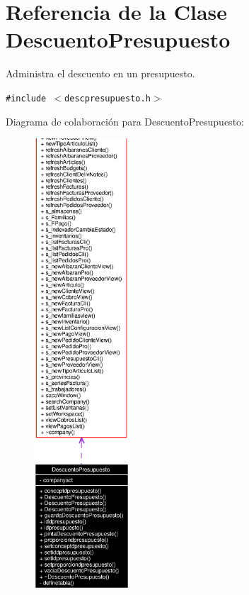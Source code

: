 \section{Referencia de la Clase Descuento\-Presupuesto}
\label{classDescuentoPresupuesto}
Administra el descuento en un presupuesto.  


{\tt \#include $<$descpresupuesto.h$>$}

Diagrama de colaboraci\'{o}n para Descuento\-Presupuesto:\begin{figure}[H]
\begin{center}
\leavevmode
\includegraphics[width=101pt]{classDescuentoPresupuesto__coll__graph}
\end{center}
\end{figure}
